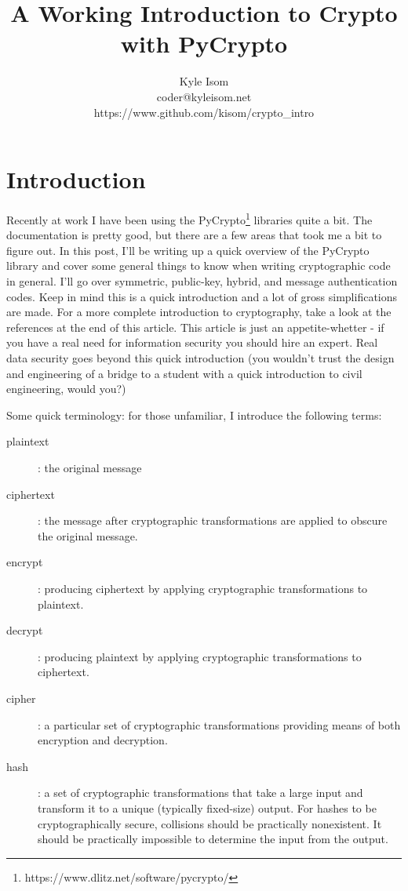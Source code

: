\documentclass[letterpaper,10pt]{article}
\title{A Working Introduction to Crypto with PyCrypto}
\author{Kyle Isom\\coder@kyleisom.net\\https://www.github.com/kisom/crypto\_intro}
\begin{document}
\maketitle
\setcounter{tocdepth}{1}
\tableofcontents

\section{Introduction}
Recently at work I have been using the 
PyCrypto\footnote{https://www.dlitz.net/software/pycrypto/} libraries quite a bit.
The documentation is pretty good, but there are a few areas that took me a bit
to figure out. In this post, I'll be writing up a quick overview of the 
PyCrypto library and cover some general things to know when writing 
cryptographic code in general. I'll go over symmetric, public-key, hybrid,
and message authentication codes. Keep in mind this is a quick introduction and
a lot of gross simplifications are made. For a more complete introduction to
cryptography, take a look at the references at the end of this article. This
article is just an appetite-whetter - if you have a real need for information
security you should hire an expert. Real data security goes beyond this quick
introduction (you wouldn't trust the design and engineering of a bridge to
a student with a quick introduction to civil engineering, would you?) 

Some quick terminology: for those unfamiliar, I introduce the following terms:
\indent
\begin{description}
  \item[plaintext]: the original message
  \item[ciphertext]: the message after cryptographic transformations are applied 
to obscure the original message.
  \item[encrypt]: producing ciphertext by applying cryptographic transformations
to plaintext.
  \item[decrypt]: producing plaintext by applying cryptographic transformations to
ciphertext.
  \item[cipher]: a particular set of cryptographic transformations providing means
of both encryption and decryption.    
  \item[hash]: a set of cryptographic transformations that take a large input and
transform it to a unique (typically fixed-size) output. For hashes to be
cryptographically secure, collisions should be practically nonexistent. It
should be practically impossible to determine the input from the output.
\end{description}
\end{document}

